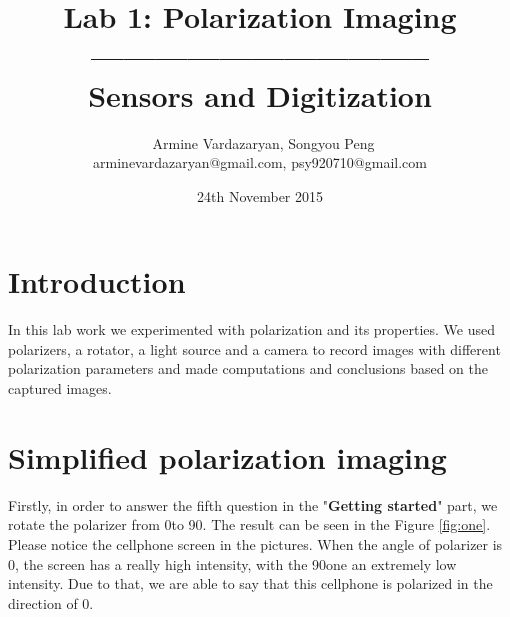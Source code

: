 \documentclass[english]{article}
\begin{document}
\title{Lab 1: Polarization Imaging\\ -------------------------------- \\ \Large Sensors and Digitization}
\author{ \ Armine Vardazaryan, Songyou Peng \\ arminevardazaryan@gmail.com, psy920710@gmail.com}
\date{24th November 2015}

\maketitle

\section{Introduction}
In this lab work we experimented with polarization and its properties. 
We used polarizers, a rotator, a light source and a camera to record images with different polarization parameters and made computations and conclusions based on the captured images.

\section{Simplified polarization imaging}
Firstly, in order to answer the fifth question in the "\textbf{Getting started}" part, we rotate the polarizer from 0\textdegree to 90\textdegree. 
The result can be seen in the Figure \ref{fig:one}. Please notice the cellphone screen in the pictures. When the angle of polarizer is 0\textdegree, the screen has a really high intensity, with the 90\textdegree one an extremely low intensity. Due to that, we are able to say that this cellphone is polarized in the direction of 0\textdegree.\\
\end{document}
